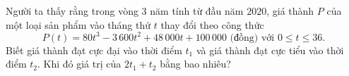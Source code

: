 \begin{bt}%

	Người ta thấy rằng trong vòng $3$ năm tính từ đầu năm $2020$, giá thành $P$ của một loại sản phẩm vào tháng thứ $t$ thay đổi theo công thức
	\[P(t)=80t^3-3\,600t^2+48\,000t+100\,000\text{ (đồng) với }0\le t\le 36.\]
	Biết giá thành đạt cực đại vào thời điểm $t_1$ và giá thành đạt cực tiểu vào thời điểm $t_2$. Khi đó giá trị của $2t_1+t_2$ bằng bao nhiêu?
	
\end{bt}

